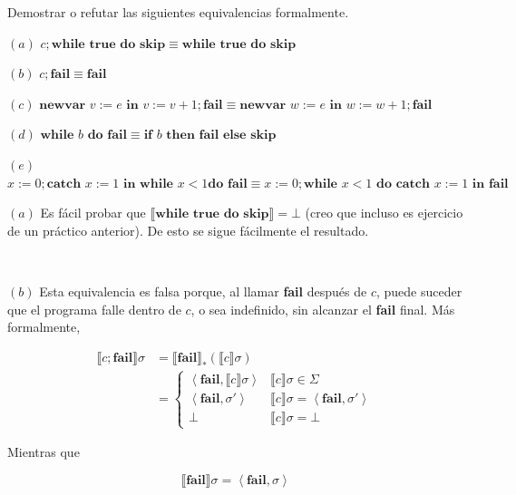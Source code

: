 \documentclass[a4paper, 12pt]{article}
\begin{document}
\begin{myframe}
  Demostrar o refutar las siguientes equivalencias formalmente.

  $(a)$  $c;\textbf{while } \textbf{true} \textbf{ do } \textbf{skip} \equiv
  \textbf{while } \textbf{true} \textbf{ do } \textbf{skip}$

  $(b)$ $c;\textbf{fail} \equiv \textbf{fail}$

  $(c)$ $\textbf{newvar } v := e \textbf{ in } v := v+1;\textbf{fail} \equiv
  \textbf{newvar } w:=e \textbf{ in } w := w+ 1; \textbf{fail}$

  $(d)$ $\textbf{while } b \textbf{ do } \textbf{fail} \equiv \textbf{if } b
  \textbf{ then } \textbf{fail} \textbf{ else } \textbf{skip}$

  $(e)$ $x:=0;\textbf{catch } x := 1 \textbf{ in } \textbf{while } x<1 \textbf{
  do } \textbf{fail} \equiv x:=0 ; \textbf{while } x < 1 \textbf{ do catch } x :=
  1 \textbf{ in fail}$
\end{myframe}

$(a)$ Es fácil probar que 
$\llbracket \textbf{while } \textbf{true} \textbf{ do }\textbf{skip}
\rrbracket = \bot $ (creo que incluso es ejercicio de un práctico anterior). De
esto se sigue fácilmente el resultado.

~

$(b)$ Esta equivalencia es falsa porque, al llamar \textbf{fail} después de $c$,
puede suceder que el programa falle dentro de $c$, o sea indefinido, sin
alcanzar el \textbf{fail} final. Más formalmente,

\begin{align*}
  \llbracket c;\textbf{fail} \rrbracket\sigma
  &= \llbracket \textbf{fail} \rrbracket_{*}\left( \llbracket c \rrbracket\sigma
  \right) \\ 
  &=\begin{cases}
    \left<\textbf{fail}, \llbracket c \rrbracket\sigma \right> & \llbracket c
    \rrbracket\sigma \in \Sigma \\ 
    \left<\textbf{fail},\sigma' \right> & \llbracket c \rrbracket\sigma =
    \left<\textbf{fail}, \sigma' \right>\\
    \bot & \llbracket c \rrbracket\sigma = \bot 
  \end{cases}
\end{align*}

Mientras que 

\begin{equation*}
  \llbracket \textbf{fail} \rrbracket\sigma = \left<\textbf{fail}, \sigma\right>
\end{equation*}
\end{document}
